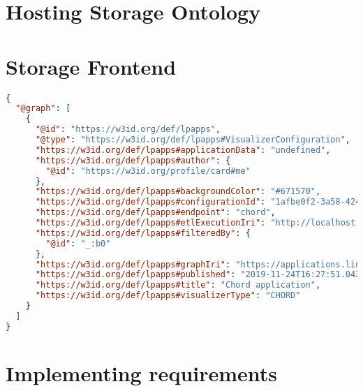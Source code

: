 \section{Hosting Storage Ontology}



\section{Storage Frontend}

\begin{lstlisting}[language=json]
{
  "@graph": [
    {
      "@id": "https://w3id.org/def/lpapps",
      "@type": "https://w3id.org/def/lpapps#VisualizerConfiguration",
      "https://w3id.org/def/lpapps#applicationData": "undefined",
      "https://w3id.org/def/lpapps#author": {
        "@id": "https://w3id.org/profile/card#me"
      },
      "https://w3id.org/def/lpapps#backgroundColor": "#671570",
      "https://w3id.org/def/lpapps#configurationId": "1afbe0f2-3a58-424e-91ec-6a41ae8717b3",
      "https://w3id.org/def/lpapps#endpoint": "chord",
      "https://w3id.org/def/lpapps#etlExecutionIri": "http://localhost:8080/resources/executions/1574612566772-0-2f47c643-55c0-419d-9313-1381cec14b1d",
      "https://w3id.org/def/lpapps#filteredBy": {
        "@id": "_:b0"
      },
      "https://w3id.org/def/lpapps#graphIri": "https://applications.linkedpipes.com/graph/84b34afd-6990-411a-920e-cb402b29797f-16dd6a86-2743-42cb-aea7-368b14aa0eff",
      "https://w3id.org/def/lpapps#published": "2019-11-24T16:27:51.043Z",
      "https://w3id.org/def/lpapps#title": "Chord application",
      "https://w3id.org/def/lpapps#visualizerType": "CHORD"
    }
  ]
}
\end{lstlisting}

\section{Implementing requirements}
